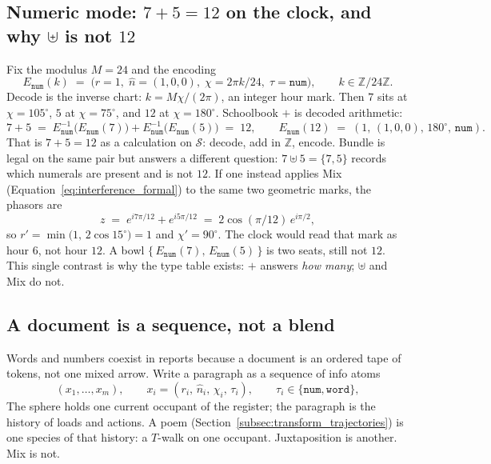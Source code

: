 \documentclass[12pt, a4paper]{article}
\begin{document}
\subsection{Numeric mode: $7+5=12$ on the clock, and why $\uplus$ is not $12$}
\label{subsec:clock_encoding}
Fix the modulus $M=24$ and the encoding
\begin{equation}
    E_{\mathtt{num}}(k)
    \;=\;
    \bigl(r=1,\;\hat n=(1,0,0),\;\chi=2\pi k/24,\;\tau=\mathtt{num}\bigr),
    \qquad
    k\in\mathbb{Z}/24\mathbb{Z}.
    \label{eq:clock_encoding}
\end{equation}
Decode is the inverse chart: $k = M\chi/(2\pi)$, an integer hour mark.
Then $7$ sits at $\chi=105^\circ$, $5$ at $\chi=75^\circ$, and $12$ at
$\chi=180^\circ$. Schoolbook $+$ is decoded arithmetic:
\begin{equation}
    7+5
    \;=\;
    E_{\mathtt{num}}^{-1}\bigl(E_{\mathtt{num}}(7)\bigr)
    +
    E_{\mathtt{num}}^{-1}\bigl(E_{\mathtt{num}}(5)\bigr)
    \;=\; 12,
    \qquad
    E_{\mathtt{num}}(12)
    \;=\;
    (1,\,(1,0,0),\,180^\circ,\,\mathtt{num}).
\end{equation}
That is $7+5=12$ as a calculation on $\mathcal{S}$: decode, add in
$\mathbb{Z}$, encode. Bundle is legal on the same pair but answers a
different question: $7\uplus 5=\{7,5\}$ records which numerals are
present and is not $12$. If one instead applies Mix
(Equation~\eqref{eq:interference_formal}) to the same two geometric
marks, the phasors are
\begin{equation}
    z
    \;=\;
    e^{i 7\pi/12} + e^{i 5\pi/12}
    \;=\;
    2\cos(\pi/12)\,e^{i\pi/2},
\end{equation}
so $r'=\min\bigl(1,\,2\cos 15^\circ\bigr)=1$ and $\chi'=90^\circ$.
The clock would read that mark as hour $6$, not hour $12$.
A bowl $\{\,E_{\mathtt{num}}(7),\,E_{\mathtt{num}}(5)\,\}$ is two seats,
still not $12$. This single contrast is why the type table exists:
$+$ answers \emph{how many}; $\uplus$ and Mix do not.

\subsection{A document is a sequence, not a blend}
\label{subsec:document_sequence}
Words and numbers coexist in reports because a document is an ordered
tape of tokens, not one mixed arrow. Write a paragraph as a sequence
of info atoms
\begin{equation}
    (x_1,\ldots,x_m),
    \qquad
    x_i=(r_i,\,\hat n_i,\,\chi_i,\,\tau_i),
    \qquad
    \tau_i\in\{\mathtt{num},\mathtt{word}\},
    \label{eq:mixed_document}
\end{equation}
The sphere holds one current occupant of the register; the paragraph is the history of
loads and actions. A poem
(Section~\ref{subsec:transform_trajectories}) is one species of that
history: a $T$-walk on one occupant. Juxtaposition is another. Mix is
not.
\end{document}
